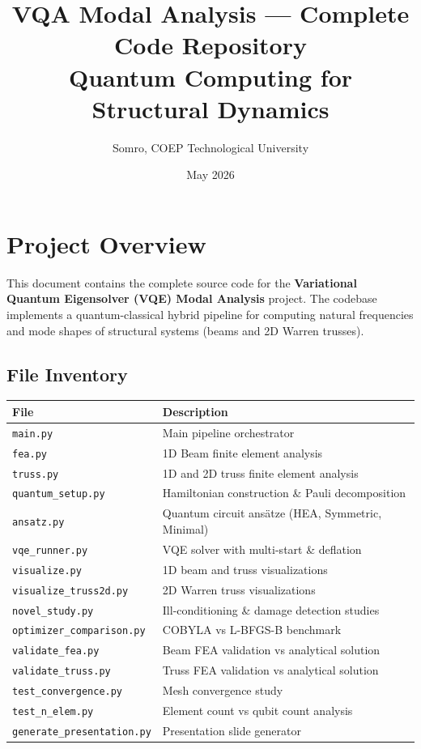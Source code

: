 \documentclass[12pt, a4paper]{article}
\title{\textbf{VQA Modal Analysis --- Complete Code Repository} \\
\large Quantum Computing for Structural Dynamics}
\author{Somro, COEP Technological University}
\date{May 2026}
\begin{document}
\maketitle
\tableofcontents
\newpage

\section{Project Overview}

This document contains the complete source code for the \textbf{Variational Quantum Eigensolver (VQE) Modal Analysis} project. The codebase implements a quantum-classical hybrid pipeline for computing natural frequencies and mode shapes of structural systems (beams and 2D Warren trusses).

\subsection{File Inventory}

\begin{table}[H]
\centering
\begin{tabular}{ll}
\toprule
\textbf{File} & \textbf{Description} \\
\midrule
\texttt{main.py} & Main pipeline orchestrator \\
\texttt{fea.py} & 1D Beam finite element analysis \\
\texttt{truss.py} & 1D and 2D truss finite element analysis \\
\texttt{quantum\_setup.py} & Hamiltonian construction \& Pauli decomposition \\
\texttt{ansatz.py} & Quantum circuit ans\"atze (HEA, Symmetric, Minimal) \\
\texttt{vqe\_runner.py} & VQE solver with multi-start \& deflation \\
\texttt{visualize.py} & 1D beam and truss visualizations \\
\texttt{visualize\_truss2d.py} & 2D Warren truss visualizations \\
\texttt{novel\_study.py} & Ill-conditioning \& damage detection studies \\
\texttt{optimizer\_comparison.py} & COBYLA vs L-BFGS-B benchmark \\
\texttt{validate\_fea.py} & Beam FEA validation vs analytical solution \\
\texttt{validate\_truss.py} & Truss FEA validation vs analytical solution \\
\texttt{test\_convergence.py} & Mesh convergence study \\
\texttt{test\_n\_elem.py} & Element count vs qubit count analysis \\
\texttt{generate\_presentation.py} & Presentation slide generator \\
\bottomrule
\end{tabular}
\end{table}
\end{document}
